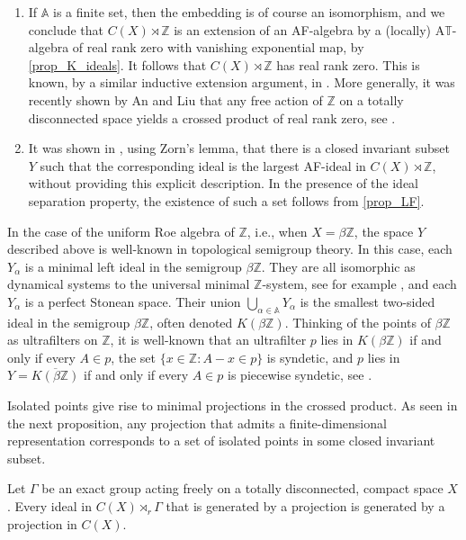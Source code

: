 \documentclass[12pt, a4paper, oneside]{amsart}
\newcommand{\0}{\mathbf{0}}
\newcommand{\1}{\mathbf{1}}
\newcommand{\Z}{\mathbb{Z}}   %
\newcommand{\bbA}{\mathbb{A}}   %
\newcommand{\T}{\mathbb{T}}
\begin{document}
	\begin{remark} 
		\begin{enumerate}
			\item If \(\bbA\) is a finite set, then the embedding is of course an isomorphism, and we conclude that $C(X) \rtimes \Z$ is an extension of an AF-algebra by a (locally) A$\T$-algebra of real rank zero with vanishing exponential map, by \cref{prop_K_ideals}. It follows that $C(X) \rtimes \Z$ has real rank zero. This is known, by a similar inductive extension argument, in \cite[Corollary 7.11]{bezuglyi}. More generally, it was recently shown by An and Liu that any free action of \(\Z\) on a totally disconnected space yields a crossed product of real rank zero, see \cite[Corollary 4.3]{an}.
			\item It was shown in \cite[Theorem 8.9]{herman}, using Zorn's lemma, that there is a closed invariant subset \(Y\) such that the corresponding ideal is the largest AF-ideal in \(C(X) \rtimes \Z\), without providing this explicit description. In the presence of the ideal separation property, the existence of such a set follows from \cref{prop_LF}.
		\end{enumerate}
	\end{remark}
	
	In the case of the uniform Roe algebra of \(\Z\), i.e., when \(X = \beta \Z\), the space \(Y\) described above is well-known in topological semigroup theory. In this case, each \(Y_\alpha\) is a minimal left ideal in the semigroup \(\beta \Z\). They are all isomorphic as dynamical systems to the universal minimal \(\Z\)-system, see for example \cite[Theorem 19.8]{hindman_strauss_alg}, and each \(Y_\alpha\) is a perfect Stonean space. Their union \(\bigcup_{\alpha \in \bbA} Y_\alpha\) is the smallest two-sided ideal in the semigroup \(\beta \Z\), often denoted \(K(\beta \Z)\). Thinking of the points of \(\beta \Z\) as ultrafilters on \(\Z\), it is well-known that an ultrafilter \(p\) lies in \(K(\beta \Z)\) if and only if every \(A \in p\), the set \(\{x \in \Z : A-x \in p\}\) is syndetic, and \(p\) lies in \(Y = \overline{K(\beta \Z)}\) if and only if  every \(A \in p\) is piecewise syndetic, see \cite[Theorem 4.40]{hindman_strauss_alg}.
	
	Isolated points give rise to minimal projections in the crossed product. As seen in the next proposition, any projection that admits a finite-dimensional representation corresponds to a set of isolated points in some closed invariant subset. 
	
	\begin{lemma}
		\label{lemma_proj}
		Let \(\Gamma\) be an exact group acting freely on a totally disconnected, compact space \(X\). Every ideal in \(C(X) \rtimes_r \Gamma\) that is generated by a projection is generated by a projection in \(C(X)\). 
	\end{lemma}
	
\end{document}
